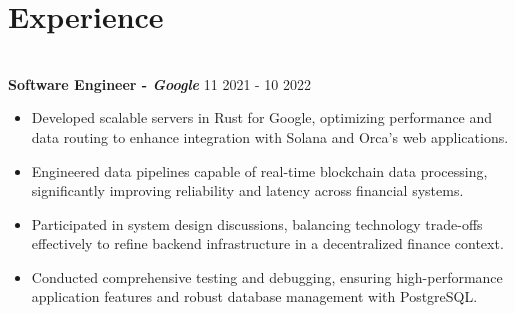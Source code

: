 \documentclass[a4paper,10pt]{article}
\begin{document}
\vspace{-10pt}
\section*{Experience}
\vspace{-3pt}
\textbf{\\ Software Engineer - \textit{Google}}  
\hfill 11 2021 - 10 2022
\begin{itemize}
\item Developed scalable servers in Rust for Google, optimizing performance and data routing to enhance integration with Solana and Orca's web applications.
\item Engineered data pipelines capable of real-time blockchain data processing, significantly improving reliability and latency across financial systems.
\item Participated in system design discussions, balancing technology trade-offs effectively to refine backend infrastructure in a decentralized finance context.
\item Conducted comprehensive testing and debugging, ensuring high-performance application features and robust database management with PostgreSQL.
\end{itemize}

\vspace{-10pt}
\end{document}
